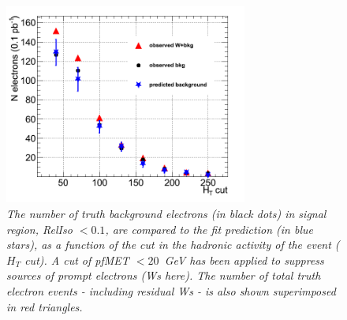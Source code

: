 \begin{figure}[h!]
\centering
\includegraphics[width=80mm]{Plots/w_fitprediction_pt10_METanticut_vsHT_MC.png}
\caption{\textit{The number of truth background electrons (in black dots) in signal region, RelIso $< 0.1$, are compared to the fit prediction (in blue stars), as a function of the cut in the hadronic activity of the event ($H_{T}$ cut). A cut of pfMET $<20$~GeV has been applied to suppress sources of prompt electrons (Ws here). The number of total truth electron events - including residual Ws - is also shown superimposed in red triangles. }}
\label{fig:w_fitprediction_mc}
\end{figure}

